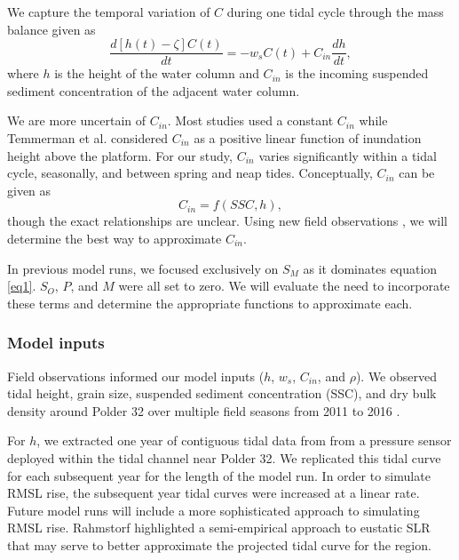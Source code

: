 \documentclass[12pt]{article}
\begin{document}
We capture the temporal variation of $C$ during one tidal cycle through the mass balance given as
\begin{equation}\label{eq3}
	\frac{d[h(t)-\zeta]C(t)}{dt} = -w_sC(t)+C_{in}\frac{dh}{dt},
\end{equation}
where $h$ is the height of the water column and $C_{in}$ is the incoming suspended sediment concentration of the adjacent water column.

We are more uncertain of $C_{in}$. Most studies \cite{kroneMethodSimulatingMarsh1987,allenSaltmarshGrowthStratification1990,frenchNumericalSimulationVertical1993,frenchTidalMarshSedimentation2006} used a constant $C_{in}$ while Temmerman et al. \cite{temmermanModellingLongtermTidal2003,temmermanModellingEstuarineVariations2004} considered $C_{in}$ as a positive linear function of inundation height above the platform. For our study, $C_{in}$ varies significantly within a tidal cycle, seasonally, and between spring and neap tides. Conceptually, $C_{in}$ can be given as
\begin{equation}\label{eq4}
	C_{in} = f(SSC, h),
\end{equation}
though the exact relationships are unclear. Using new field observations \cite{haleObservationsScalingTidal2019}, we will determine the best way to approximate $C_{in}$.

In previous model runs, we focused exclusively on $S_M$ as it dominates equation \ref{eq1}. $S_O$, $P$, and $M$ were all set to zero. We will evaluate the need to incorporate these terms and determine the appropriate functions to approximate each.

\subsubsection*{Model inputs}

Field observations informed our model inputs ($h$, $w_s$, $C_{in}$, and $\rho$). We observed tidal height, grain size, suspended sediment concentration (SSC), and dry bulk density around Polder 32 over multiple field seasons from 2011 to 2016 \cite{auerbachFloodRiskNatural2015,haleObservationsScalingTidal2019}.

For $h$, we extracted one year of contiguous tidal data from from a pressure sensor deployed within the tidal channel near Polder 32. We replicated this tidal curve for each subsequent year for the length of the model run. In order to simulate RMSL rise, the subsequent year tidal curves were increased at a linear rate. Future model runs will include a more sophisticated approach to simulating RMSL rise. Rahmstorf \cite{rahmstorfSemiEmpiricalApproachProjecting2007} highlighted a semi-empirical approach to eustatic SLR that may serve to better approximate the projected tidal curve for the region.
\end{document}
